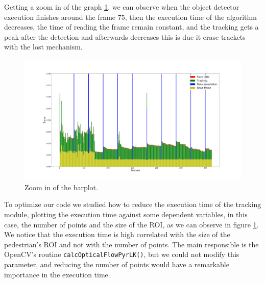 Getting a zoom in of the graph \ref{timing2}, we can observe when the object detector execution finishes around the frame $75$, then the execution time of the algorithm decreases, the time of reading the frame remain constant, and the tracking gets a peak after the detection and afterwards decreases this is due it erase trackets with the lost mechanism. 

\begin{figure}[H]
\centering         
\includegraphics[width=0.9\linewidth]{graphicsRearrange/temps/timeSpecfici.png}
\caption{Zoom in of the barplot.} \label{timing2}
\end{figure}

To optimize our code we studied how to reduce the execution time of the tracking module, plotting the execution time against some dependent variables, in this case, the number of points and the size of the ROI, as we can observe in figure \ref{timing2}. We notice that the execution time is high correlated with the size of the pedestrian's ROI and not with the number of points. The main responsible is the OpenCV's routine \texttt{calcOpticalFlowPyrLK()}, but we could not modify this parameter, and reducing the number of points would have a remarkable importance in the execution time. 



